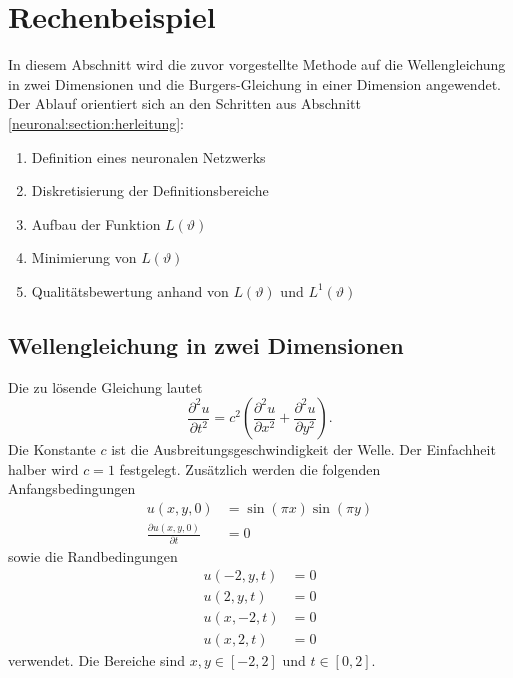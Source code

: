%
%
%
%

\section{Rechenbeispiel}\label{neuronal:section:rechenbeispiel}

In diesem Abschnitt wird die zuvor vorgestellte Methode auf die Wellengleichung in zwei Dimensionen und die Burgers-Gleichung in einer Dimension angewendet.
Der Ablauf orientiert sich an den Schritten aus Abschnitt \ref{neuronal:section:herleitung}:
\begin{enumerate}
    \item Definition eines neuronalen Netzwerks
    \item Diskretisierung der Definitionsbereiche
    \item Aufbau der Funktion $L(\vartheta)$
    \item Minimierung von $L(\vartheta)$
    \item Qualitätsbewertung anhand von $L(\vartheta)$ und $L^1(\vartheta)$
\end{enumerate}

\subsection{Wellengleichung in zwei Dimensionen}\label{neuronal:subsection:wellengleichung}
Die zu lösende Gleichung lautet
\begin{equation}
    \frac{\partial^2 u}{\partial t^2} = c^2 \left( \frac{\partial^2 u}{\partial x^2} + \frac{\partial^2 u}{\partial y^2} \right).
    \label{neuronal:wellengleichung}
\end{equation}
Die Konstante \( c \) ist die Ausbreitungsgeschwindigkeit der Welle. Der Einfachheit halber wird \( c = 1 \) festgelegt.
Zusätzlich werden die folgenden Anfangsbedingungen
\begin{equation}
    \begin{aligned}
        u(x, y, 0) &= \sin(\pi x) \sin(\pi y)\\
        \frac{\partial u(x, y, 0)}{\partial t} &= 0
    \end{aligned}
    \label{neuronal:wellen_anfangs}
\end{equation}
sowie die Randbedingungen
\begin{equation}
    \begin{aligned}
        u(-2, y, t) &= 0\\
        u(2, y, t) &= 0\\
        u(x, -2, t) &= 0\\
        u(x, 2, t) &= 0
    \end{aligned}
    \label{neuronal:wellen_rand}
\end{equation}
verwendet.
Die Bereiche sind \( x, y \in [-2,2] \) und \( t \in [0,2] \).

